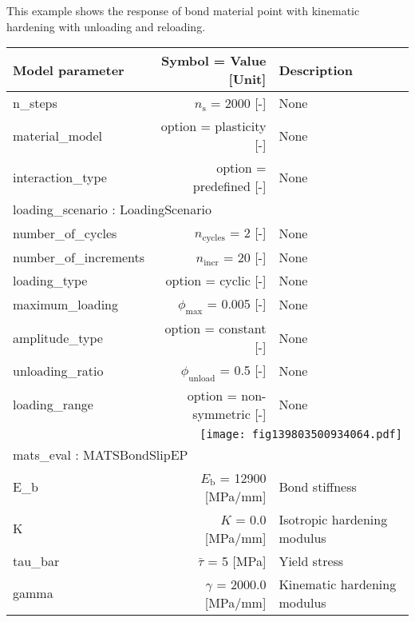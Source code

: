 \documentclass{article}
\newcounter{bmcsexample}
\begin{document}
        
\begin{bmcsexample}
\noindent This example shows the response of bond material point 
with kinematic hardening with unloading and reloading.
 \\[3mm]
\begin{center}
\begin{tabular}{lrp{4cm}}\hline
Model parameter & Symbol = Value [Unit] & Description  \\\hline \hline
n\_steps & $n_\mathrm{s}$ = 2000 [-] & {\footnotesize None}  \\
            material\_model & option = plasticity [-] & {\footnotesize None}  \\
            interaction\_type & option = predefined [-] & {\footnotesize None}  \\
            \hline
\multicolumn{3}{l}{loading\_scenario : LoadingScenario}\\ \hline

number\_of\_cycles & $n_\mathrm{cycles}$ = 2 [-] & {\footnotesize None}  \\
            number\_of\_increments & $n_{\mathrm{incr}}$ = 20 [-] & {\footnotesize None}  \\
            loading\_type & option = cyclic [-] & {\footnotesize None}  \\
            maximum\_loading & $\phi_{\max}$ = 0.005 [-] & {\footnotesize None}  \\
            amplitude\_type & option = constant [-] & {\footnotesize None}  \\
            unloading\_ratio & $\phi_{\mathrm{unload}}$ = 0.5 [-] & {\footnotesize None}  \\
            loading\_range & option = non-symmetric [-] & {\footnotesize None}  \\
            
\multicolumn{3}{r}{\texttt{[image: fig139803500934064.pdf]}}\\
\hline
\multicolumn{3}{l}{mats\_eval : MATSBondSlipEP}\\ \hline

E\_b & $E_\mathrm{b}$ = 12900 [MPa/mm] & {\footnotesize Bond stiffness}  \\
            K & $K$ = 0.0 [MPa/mm] & {\footnotesize Isotropic hardening modulus}  \\
            tau\_bar & $\bar{\tau}$ = 5 [MPa] & {\footnotesize Yield stress}  \\
            gamma & $\gamma$ = 2000.0 [MPa/mm] & {\footnotesize Kinematic hardening modulus}  \\
            \hline \end{tabular}



\end{center}
\end{bmcsexample}
\end{document}
